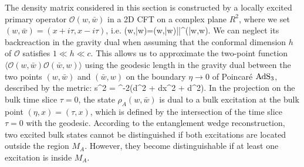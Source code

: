 \documentclass[12pt]{article}
\def\[#1\]{\begin{align}#1\end{align}}
\def \et{\eta}
\def \ra{\rangle}
\def \la{\langle}
\def \mo{\mathcal{O}}
\begin{document}
 The density matrix considered in this section is constructed by a locally excited primary operator $\mo(w,\bar w)$ in a 2D CFT on a complex plane $R^2$, where we set $(w,\bar w)=(x+i\tau,x-i\tau)$, i.e.
 \[
 \rho(w,\bar w)=\mo(w,\bar w)|\Omega\ra\la\Omega|\mo^\dagger(\bar w,w).
 \]
 We can neglect its backreaction in the gravity dual when assuming that the conformal dimension $h$ of $\mo$ satisfies $1\ll h\ll c$. This allows us to approximate the two-point function  $\langle \mathcal{O}(w, \bar{w}) \mathcal{O}(\bar{w}, w) \rangle$ using the geodesic length in the gravity dual between the two points  $(w, \bar{w})$  and  $(\bar{w}, w)$  on the boundary $ \eta \to 0$  of Poincaré $\rm AdS_3$, described by the metric:
\[
ds^2 = \eta^{-2}(d\eta^2 + dx^2 + d\tau^2).
\] 
In the projection on the bulk time slice \(\tau = 0\), the state \(\rho_A(w, \bar{w})\) is dual to a bulk excitation at the bulk point \((\eta, x) = (\tau, x)\), which is defined by the intersection of the time slice \(\tau = 0\) with the geodesic. According to the entanglement wedge reconstruction, two excited bulk states cannot be distinguished if both excitations are located outside the region \(M_A\). However, they become distinguishable if at least one excitation is inside \(M_A\).
\end{document}
